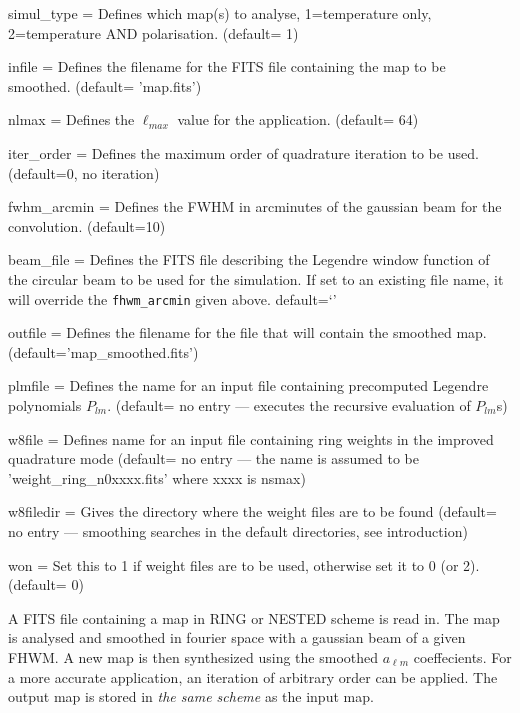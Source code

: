 \begin{qualifiers}
  \begin{qulist}{} %
     \item[{simul\_type = }] Defines which map(s) to analyse, 1=temperature only, 2=temperature AND polarisation.
(default= 1)
    \item[{infile = }] Defines the filename for the FITS file containing the map to be smoothed. 
	(default= 'map.fits')
    \item[{nlmax = }] Defines the $\ell_{max}$ value for the application.
(default= 64)
    \item[{iter\_order = }] Defines the maximum order of quadrature 
      iteration to be used. (default=0, no iteration)
 \item[{fwhm\_arcmin = }] Defines the FWHM in arcminutes of the gaussian 
beam for the convolution. (default=10)
    \item[{beam\_file = }] Defines the FITS file describing the
    Legendre window
    function of the circular beam to be used for the
    simulation. If set to an existing file name, it will override the
    {\tt fhwm\_arcmin} given above. default=`'
\item[{outfile = }] Defines the filename for the file that will contain 
the smoothed map. (default='map\_smoothed.fits')
     \item[{plmfile = }] Defines the name for an input file
    containing  precomputed Legendre polynomials $P_{lm}$.
(default= no entry ---  executes the recursive evaluation 
of $P_{lm}$s)
\item[{w8file = }] Defines name for an input file containing ring
  weights in the improved quadrature mode (default= no entry ---
the name is assumed to be 'weight\_ring\_n0xxxx.fits' where xxxx is nsmax)
\item[{w8filedir = }] Gives the directory where the weight files are
to be found (default= no entry --- smoothing searches in the default
directories, see introduction)
\item[{won = }] Set this to 1 if weight files are to be used,
otherwise set it to 0 (or 2). (default= 0)
  \end{qulist}
\end{qualifiers}

\begin{codedescription}
{
A FITS file containing a \healpix map in RING or NESTED scheme is read in.
The map is analysed and smoothed in fourier space with a  gaussian beam 
of a given FHWM. 
A new map is then synthesized using the smoothed $a_{\ell m}$ coeffecients. 
For a more accurate application, an iteration of arbitrary order can be applied. 
The output map is stored in {\em the same scheme} as the input map.
}
\end{codedescription}

